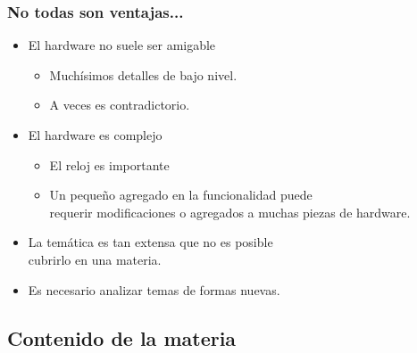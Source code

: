 \documentclass[aspectratio=169,compress]{beamer}
\begin{document}
\begin{frame}[fragile]
  \frametitle{No todas son ventajas...}

\begin{small}
\begin{itemize}

\item El hardware no suele ser amigable

\begin{itemize}
\item Muchísimos detalles de bajo nivel.
\item A veces es contradictorio.
\end{itemize}

\item El hardware es complejo
\begin{itemize}
\item  El reloj es importante
\item Un pequeño agregado en la funcionalidad puede \\
requerir modificaciones o agregados a muchas piezas de hardware.
\end{itemize}
\item La temática es tan extensa que no es posible \\
cubrirlo en una materia.
\item Es necesario analizar temas de formas nuevas.

\end{itemize}
\end{small}

\end{frame}


\subsection{Contenido de la materia}
\end{document}

